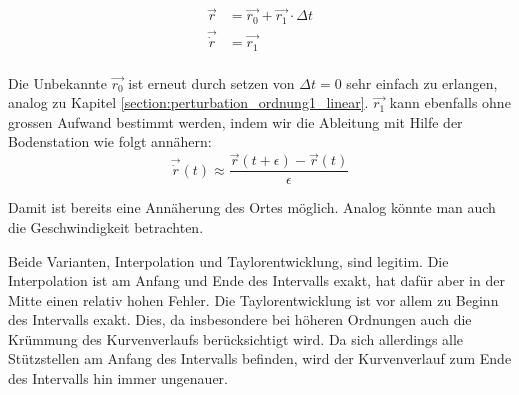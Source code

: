 \begin{equation}
\label{eq:ordnung1_taylor_ansatz}
\begin{aligned}
\vec{r} &=  \vec{r_0} + \vec{r_1} \cdot \Delta t \\
\vec{\dot{r}} &= \vec{r_1} \\
\end{aligned}
\end{equation}

Die Unbekannte $\vec{r_0}$ ist erneut durch setzen von $\Delta t = 0$ sehr einfach zu erlangen, analog zu Kapitel \ref{section:perturbation_ordnung1_linear}.
$\vec{r_1}$ kann ebenfalls ohne grossen Aufwand bestimmt werden, indem wir die Ableitung mit Hilfe der Bodenstation wie folgt annähern:
\[
\vec{\dot{r}}(t) \approx \frac{\vec{r}(t+\epsilon) - \vec{r}(t)}{\epsilon}
\]

Damit ist bereits eine Annäherung des Ortes möglich.
Analog könnte man auch die Geschwindigkeit betrachten.

Beide Varianten, Interpolation und Taylorentwicklung, sind legitim.
Die Interpolation ist am Anfang und Ende des Intervalls exakt, hat dafür aber in der Mitte einen relativ hohen Fehler.
Die Taylorentwicklung ist vor allem zu Beginn des Intervalls exakt.
Dies, da insbesondere bei höheren Ordnungen auch die Krümmung des Kurvenverlaufs berücksichtigt wird.
Da sich allerdings alle Stützstellen am Anfang des Intervalls befinden, wird der Kurvenverlauf zum Ende des Intervalls hin immer ungenauer.
